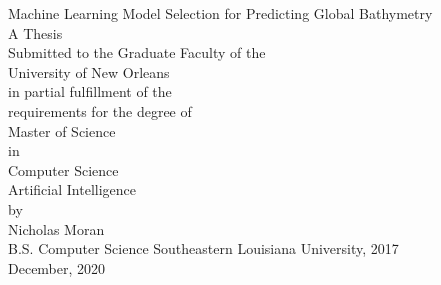 \begin{titlepage}
    \begin{center}

        Machine Learning Model Selection for Predicting Global Bathymetry \\
        \vspace*{66pt}
        A Thesis\\
        \vspace*{66pt}
        Submitted to the Graduate Faculty of the \\ University of New Orleans \\ in partial fulfillment of the \\ requirements for the degree of \\
        \vspace*{66pt}
        Master of Science \\ in \\ Computer Science  \\
        Artificial Intelligence \\
        \vspace*{66pt}
        by\\
        Nicholas Moran\\
        B.S. Computer Science Southeastern Louisiana University, 2017\\
        \vspace*{11pt}
        December, 2020\\         
    \end{center}
 \end{titlepage}